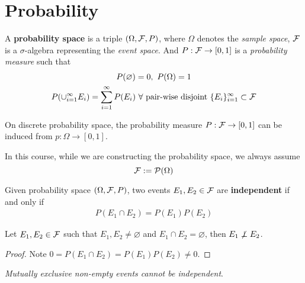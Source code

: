 \documentclass{article}
\begin{document}
	\section{Probability}
		\begin{definition}
			A \textbf{probability space} is a triple $(\Omega, \mathcal{{F}}, P)$, where $\Omega$ denotes the \emph{sample space}, $\mathcal{{F}}$ is a $\sigma$-algebra representing the \emph{event space}. And $P: \mathcal{{F}} \to [0, 1]$ is a \emph{probability measure} such that
			\begin{gather}
				P(\varnothing) = 0,\ 
				P(\Omega) = 1 \\
				P(\cup_{i=1}^\infty E_i) = \sum_{i=1}^\infty P(E_i)\ \forall \tx{ pair-wise disjoint } \{E_i\}_{i=1}^\infty \subset \mc{F}
			\end{gather}
		\end{definition}
		
		\begin{proposition}
			On discrete probability space, the probability measure $P: \mathcal{{F}} \to [0, 1]$ can be induced from $p: \Omega \to [0, 1]$.
		\end{proposition}
		
		\begin{assumption}
			In this course, while we are constructing the probability space, we always assume 
			\begin{equation}
				\mathcal{{F}} := \mathcal{{P}}(\Omega)
			\end{equation}
		\end{assumption}
		
		\begin{definition}
			Given probability space $(\Omega, \mathcal{{F}}, P)$, two events $E_1, E_2 \in \mathcal{{F}}$ are \textbf{independent} if and only if 
			\begin{gather}
				P(E_1 \cap E_2) = P(E_1) P(E_2)
			\end{gather}
		\end{definition}
		
		\begin{proposition}
			Let $E_1, E_2 \in \mathcal{{F}}$ such that $E_1, E_2 \neq \varnothing$ and $E_1 \cap E_2 = \varnothing$, then $E_1 \centernot \perp E_2$.
			\begin{proof}
				Note $0 = P(E_1 \cap E_2) = P(E_1)P(E_2) \neq 0$.
			\end{proof}
			\emph{Mutually exclusive non-empty events cannot be independent}.
		\end{proposition}
		
\end{document}
